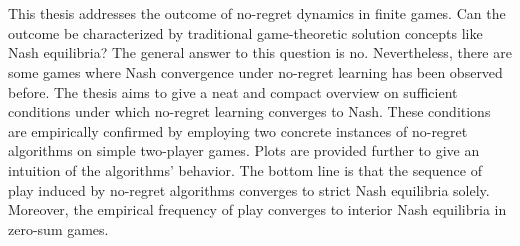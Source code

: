 \chapter{\abstractname}

This thesis addresses the outcome of no-regret dynamics in finite games. Can the outcome be characterized by traditional game-theoretic solution concepts like Nash equilibria? The general answer to this question is no. Nevertheless, there are some games where Nash convergence under no-regret learning has been observed before. The thesis aims to give a neat and compact overview on sufficient conditions under which no-regret learning converges to Nash. These conditions are empirically confirmed by employing two concrete instances of no-regret algorithms on simple two-player games. Plots are provided further to give an intuition of the algorithms' behavior. The bottom line is that the sequence of play induced by no-regret algorithms converges to strict Nash equilibria solely. Moreover, the empirical frequency of play converges to interior Nash equilibria in zero-sum games.
